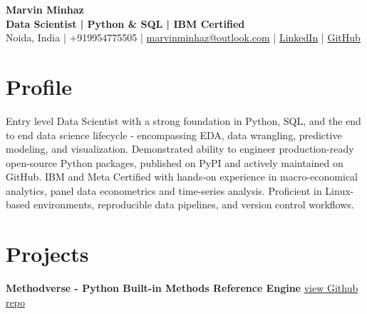 \documentclass[10pt, letterpaper]{article}
\begin{document}
\pagestyle{empty}

\begin{center}
    {\Huge \textbf{Marvin Minhaz}}\\[0.5em]
    \textbf{Data Scientist | Python \& SQL | IBM Certified}\\[0.2em]
    Noida, India | +919954775505 | \href{mailto:marvinminhaz@outlook.com}{marvinminhaz@outlook.com} | \href{https://linkedin.com/in/marvinminhaz}{LinkedIn} | \href{https://github.com/marvinminhaz}{GitHub}
\end{center}

\section{Profile}
Entry level Data Scientist with a strong foundation in Python, SQL, and the end to end data science lifecycle - encompassing EDA, data wrangling, predictive modeling, and visualization. Demonstrated ability to engineer production-ready open-source Python packages, published on PyPI and actively maintained on GitHub. IBM and Meta Certified with hands-on experience in macro-economical analytics, panel data econometrics and time-series analysis. Proficient in Linux-based environments, reproducible data pipelines, and version control workflows.

\section{Projects}
\noindent\textbf{Methodverse - Python Built-in Methods Reference Engine} \href{https://github.com/marvinminhaz/methodverse}{view Github repo}
\end{document}
